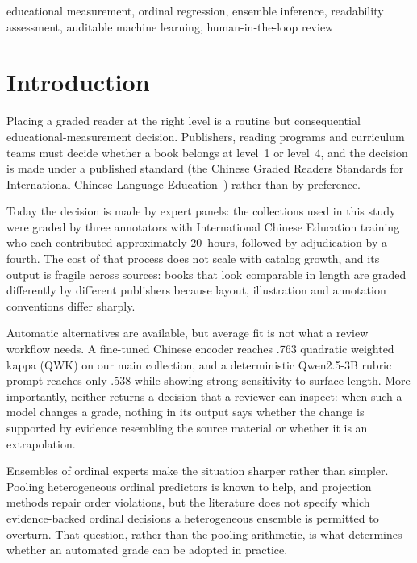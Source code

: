 \documentclass[conference]{IEEEtran}
\begin{document}
\begin{IEEEkeywords}
educational measurement, ordinal regression, ensemble inference, readability
assessment, auditable machine learning, human-in-the-loop review
\end{IEEEkeywords}

\section{Introduction}

Placing a graded reader at the right level is a routine but consequential
educational-measurement decision. Publishers, reading programs and
curriculum teams must decide whether a book belongs at level~1 or level~4, and
the decision is made under a published standard (the Chinese Graded Readers
Standards for International Chinese Language Education~\cite{cllc2024standards})
rather than by preference.

Today the decision is made by expert panels: the collections used in this study
were graded by three annotators with International Chinese Education training
who each contributed approximately 20~hours, followed by adjudication by a
fourth. The cost of that process does not scale with catalog growth, and its
output is fragile across sources: books that look comparable in length are
graded differently by different publishers because layout, illustration and
annotation conventions differ sharply.

Automatic alternatives are available, but average fit is not what a review
workflow needs. A fine-tuned Chinese encoder reaches .763 quadratic weighted
kappa (QWK) on our main collection, and a deterministic Qwen2.5-3B rubric
prompt reaches only .538 while showing strong sensitivity to surface length.
More importantly, neither returns a decision that a reviewer can inspect: when
such a model changes a grade, nothing in its output says whether the change is
supported by evidence resembling the source material or whether it is an
extrapolation.

Ensembles of ordinal experts make the situation sharper rather than simpler.
Pooling heterogeneous ordinal predictors is known to help, and projection
methods repair order violations, but the literature does not specify which
evidence-backed ordinal decisions a heterogeneous ensemble is permitted to
overturn. That question, rather than the pooling arithmetic, is what determines
whether an automated grade can be adopted in practice.
\end{document}
